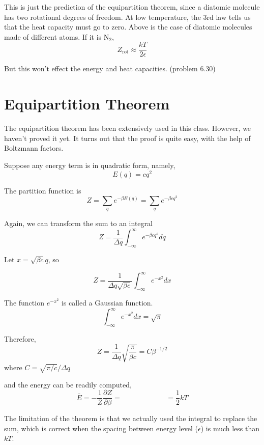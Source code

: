 This is just the prediction of the equipartition theorem, since a diatomic molecule has two rotational degrees of freedom. 
At low temperature, the 3rd law tells us that the heat capacity must go to zero.
Above is the case of diatomic molecules made of different atoms. If it is N$_2$, 
\begin{equation}
Z_\text{rot} \approx \frac{kT}{2\epsilon}
\end{equation}
 
But this won't effect the energy and heat capacities. (problem 6.30)


\section{Equipartition Theorem}
The equipartition theorem has been extensively used in this class. However, we haven't proved it yet.
It turns out that the proof is quite easy, with the help of Boltzmann factors.

Suppose any energy term is in quadratic form, namely,
\begin{equation}
E(q) = cq^2
\end{equation}

The partition function is
\begin{equation}
Z = \sum_q e^{-\beta E(q)} = \sum_q e^{-\beta cq^2}
\end{equation}

Again, we can transform the sum to an integral
\begin{equation}
Z = \frac{1}{\Delta{q}} \int_{-\infty}^{\infty}  e^{-\beta cq^2} dq
\end{equation}

Let $x=\sqrt{\beta c}q$, so 

\begin{equation}
Z = \frac{1}{\Delta{q}\sqrt{\beta c}}\int_{-\infty}^{\infty}  e^{-x^2} dx
\end{equation}

The function $e^{-x^2}$ is called a Gaussian function.
\begin{equation}
\int_{-\infty}^{\infty}  e^{-x^2} dx = \sqrt{\pi}
\end{equation}

Therefore,
\begin{equation}
Z = \frac{1}{\Delta{q}} \sqrt{\frac{\pi}{\beta c}} = C\beta^{-1/2}
\end{equation}
where $C=\sqrt{\pi/c}/\Delta{q}$

and the energy can be readily computed,
\begin{equation}
\bar{E} = -\frac{1}{Z} \frac{\partial Z}{\partial {\beta}} = ~~~~~~~~~~~~~~~~~~~~~~~~~~~~ = \frac{1}{2}kT
\end{equation}

The limitation of the theorem is that we actually used the integral to replace the sum, which is correct when the spacing between energy level ($\epsilon$) is much less than $kT$.


